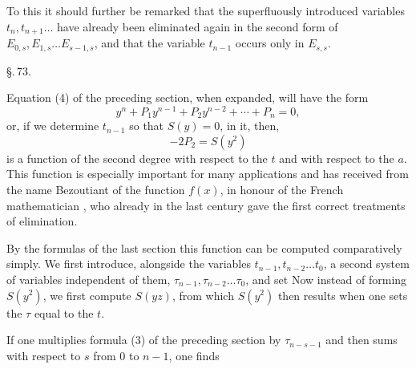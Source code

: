 To this it should further be remarked that the superfluously introduced
variables $t_n, t_{n+1} \ldots$ have already been eliminated again in the
second form of $E_{0,s}, E_{1,s} \ldots E_{s-1,s}$, and that the variable
$t_{n-1}$ occurs only in $E_{s,s}$.

\begin{center}
\S.\,73.

\end{center}

Equation (4) of the preceding section, when expanded, will have
the form
\[
y^n + P_1 y^{n-1} + P_2 y^{n-2} + \cdots + P_n = 0,
\]
or, if we determine $t_{n-1}$ so that $S(y) = 0$,
in it, then,
\[
- 2 P_2 = S(y^2)
\]
is a function of the second degree with respect to the $t$ and with
respect to the $a$. This function is especially important for many
applications and has received from  the name Bezoutiant
of the function $f(x)$, in honour of the French mathematician
, who already in the last century gave the first
correct treatments of elimination.

By the formulas of the last section this function can be
computed comparatively simply. We first introduce, alongside
the variables $t_{n-1}, t_{n-2} \ldots t_0$, a second
system of variables independent of them, $\tau_{n-1}, \tau_{n-2} \ldots \tau_0$, and
set
Now instead of forming $S(y^2)$, we first compute $S(yz)$,
from which $S(y^2)$ then results when one sets the $\tau$ equal to the $t$.

If one multiplies formula (3) of the preceding section
by $\tau_{n-s-1}$ and then sums with respect to $s$ from $0$ to $n-1$,
one finds
